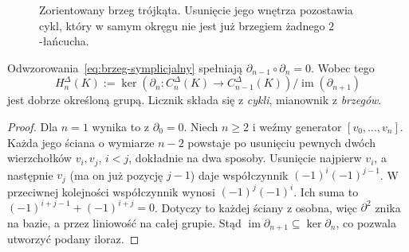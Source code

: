 \begin{figure}[!htbp]
\centering
{}
\caption{Zorientowany brzeg trójkąta. Usunięcie jego
wnętrza pozostawia cykl, który w samym okręgu
nie jest już brzegiem żadnego $2$-łańcucha.}
\label{fig:homologia-trojkat}
\end{figure}

\begin{twierdzenie}
\label{thm:brzeg-brzegu}
Odwzorowania~\eqref{eq:brzeg-symplicjalny}
spełniają $\partial_{n-1}\circ\partial_n=0$.
Wobec tego
\[
 H_n^\Delta(K):=
 \ker(\partial_n:C_n^\Delta(K)\to C_{n-1}^\Delta(K))
 \big/
 \operatorname{im}(\partial_{n+1})
\]
jest dobrze określoną grupą. Licznik składa
się z \emph{cykli}, mianownik z \emph{brzegów}.
\end{twierdzenie}
\begin{proof}
Dla $n=1$ wynika to z $\partial_0=0$.
Niech $n\geq2$ i weźmy generator
$[v_0,\ldots,v_n]$. Każda jego ściana
o wymiarze $n-2$ powstaje po usunięciu
pewnych dwóch wierzchołków $v_i,v_j$,
$i<j$, dokładnie na dwa sposoby.
Usunięcie najpierw $v_i$, a następnie
$v_j$ (ma on już pozycję $j-1$) daje
współczynnik $(-1)^i(-1)^{j-1}$.
W przeciwnej kolejności współczynnik
wynosi $(-1)^j(-1)^i$.
Ich suma to
$(-1)^{i+j-1}+(-1)^{i+j}=0$.
Dotyczy to każdej ściany z osobna,
więc $\partial^2$ znika na bazie,
a przez liniowość na całej grupie.
Stąd $\operatorname{im}\partial_{n+1}
\subseteq\ker\partial_n$, co pozwala
utworzyć podany iloraz.
\end{proof}

